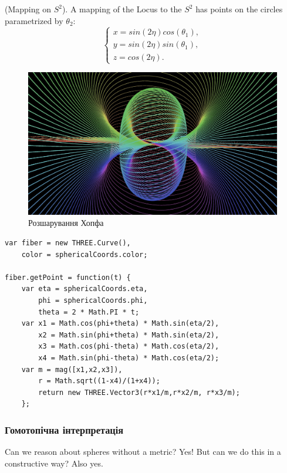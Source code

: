 \begin{definition} (Mapping on $S^2$).
A mapping of the Locus to the $S^2$ has points on the circles
parametrized by $\theta_2$:
$$
\begin{cases}
x = sin(2\eta)cos(\theta_1), \\
y = sin(2\eta)sin(\theta_1), \\
z = cos(2\eta).
\end{cases}
$$
\begin{figure}
  \centerline{\includegraphics[scale=0.4]{hopf-2.jpeg}}
  \caption{Розшарування Хопфа}
\end{figure}
\begin{lstlisting}
var fiber = new THREE.Curve(),
    color = sphericalCoords.color;

fiber.getPoint = function(t) {
    var eta = sphericalCoords.eta,
        phi = sphericalCoords.phi,
        theta = 2 * Math.PI * t;
    var x1 = Math.cos(phi+theta) * Math.sin(eta/2),
        x2 = Math.sin(phi+theta) * Math.sin(eta/2),
        x3 = Math.cos(phi-theta) * Math.cos(eta/2),
        x4 = Math.sin(phi-theta) * Math.cos(eta/2);
    var m = mag([x1,x2,x3]),
        r = Math.sqrt((1-x4)/(1+x4));
        return new THREE.Vector3(r*x1/m,r*x2/m, r*x3/m);
    };
\end{lstlisting}
\end{definition}

\subsubsection*{Гомотопічна інтерпретація}
Can we reason about spheres without a metric? Yes!
But can we do this in a constructive way? Also yes.

